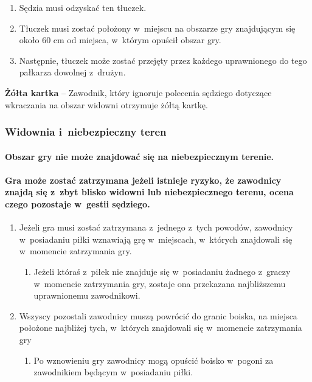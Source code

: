 \documentclass[12pt]{article}
\newcommand\yellowcard[1]{\bgroup\textcolor{darkyellow}{\textbf{#1}}}
\begin{document}
\begin{enumerate}
\begin{enumerate}
		            \begin{enumerate}
			            \item
			                  Sędzia musi odzyskać ten tłuczek.
			            \item
			                  Tłuczek musi zostać położony w~miejscu na obszarze gry znajdującym
			                  się około 60 cm od miejsca, w~którym opuścił obszar gry.
			            \item
			                  Następnie, tłuczek może zostać przejęty przez każdego uprawnionego
			                  do tego pałkarza dowolnej z~drużyn.
		            \end{enumerate}
	      \end{enumerate}
\end{enumerate}

\yellowcard{Żółta kartka} -- Zawodnik, który ignoruje polecenia sędziego
dotyczące wkraczania na obszar widowni otrzymuje żółtą kartkę.

\subsubsection{Widownia i~niebezpieczny teren}

\paragraph{Obszar gry nie może znajdować się na niebezpiecznym terenie.}

\paragraph{Gra może zostać zatrzymana jeżeli istnieje ryzyko, że
	zawodnicy znajdą się z~zbyt blisko widowni lub niebezpiecznego terenu,
	ocena czego pozostaje w~gestii sędziego.}

\begin{enumerate}
	\item
	      Jeżeli gra musi zostać zatrzymana z~jednego z~tych powodów, zawodnicy
	      w~posiadaniu piłki wznawiają grę w~miejscach, w~których znajdowali się
	      w~momencie zatrzymania gry.

	      \begin{enumerate}
		      \item
		            Jeżeli któraś z~piłek nie znajduje się w~posiadaniu żadnego z~graczy
		            w~momencie zatrzymania gry, zostaje ona przekazana najbliższemu
		            uprawnionemu zawodnikowi.
	      \end{enumerate}
	\item
	      Wszyscy pozostali zawodnicy muszą powrócić do granic boiska, na
	      miejsca położone najbliżej tych, w~których znajdowali się w~momencie
	      zatrzymania gry

	      \begin{enumerate}
		      \item
		            Po wznowieniu gry zawodnicy mogą opuścić boisko w~pogoni za
		            zawodnikiem będącym w~posiadaniu piłki.
	      \end{enumerate}
\end{enumerate}
\end{document}
